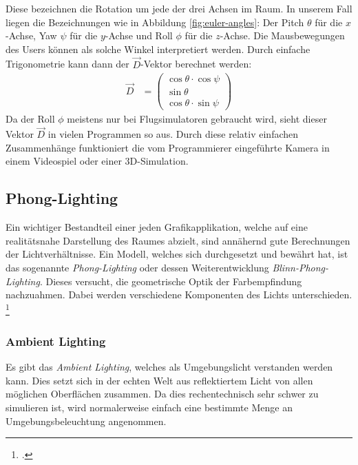 \documentclass[titlepage, 11pt, a4paper, ngerman]{article}
\begin{document}
Diese bezeichnen die Rotation um jede der drei Achsen im Raum. In unserem Fall liegen die Bezeichnungen wie in Abbildung \ref{fig:euler-angles}: Der Pitch $\theta$ für die $x$-Achse, Yaw $\psi$ für die $y$-Achse und Roll $\phi$ für die $z$-Achse. Die Mausbewegungen des Users können als solche Winkel interpretiert werden. Durch einfache Trigonometrie kann dann der $\vec{D}$-Vektor berechnet werden:
\begin{align*}
    \vec{D} &= \begin{pmatrix}
    \cos{\theta} \cdot \cos{\psi} \\
    \sin{\theta} \\
    \cos{\theta} \cdot \sin{\psi}
    \end{pmatrix}
\end{align*}
\bigbreak
Da der Roll $\phi$ meistens nur bei Flugsimulatoren gebraucht wird, sieht dieser Vektor $\vec{D}$ in vielen Programmen so aus. Durch diese relativ einfachen Zusammenhänge funktioniert die vom Programmierer eingeführte Kamera in einem Videospiel oder einer 3D-Simulation.

\subsection{Phong-Lighting}
Ein wichtiger Bestandteil einer jeden Grafikapplikation, welche auf eine realitätsnahe Darstellung des Raumes abzielt, sind annähernd gute Berechnungen der Lichtverhältnisse. Ein Modell, welches sich durchgesetzt und bewährt hat, ist das sogenannte \textit{Phong-Lighting} oder dessen Weiterentwicklung \textit{Blinn-Phong-Lighting}. Dieses versucht, die geometrische Optik der Farbempfindung nachzuahmen. Dabei werden verschiedene Komponenten des Lichts unterschieden. \footcite{logl-lighting}

\subsubsection{Ambient Lighting} 
Es gibt das \textit{Ambient Lighting}, welches als Umgebungslicht verstanden werden kann. Dies setzt sich in der echten Welt aus reflektiertem Licht von allen möglichen Oberflächen zusammen. Da dies rechentechnisch sehr schwer zu simulieren ist, wird normalerweise einfach eine bestimmte Menge an Umgebungsbeleuchtung angenommen. 
\end{document}
